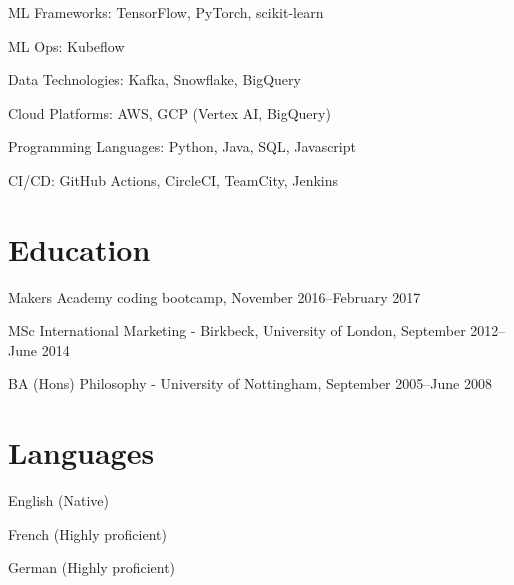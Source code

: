 \documentclass[a4paper]{scrartcl}
\begin{document}
ML Frameworks: TensorFlow, PyTorch, scikit-learn

ML Ops: Kubeflow

Data Technologies: Kafka, Snowflake, BigQuery

Cloud Platforms: AWS, GCP (Vertex AI, BigQuery)

Programming Languages: Python, Java, SQL, Javascript

CI/CD: GitHub Actions, CircleCI, TeamCity, Jenkins

\section*{Education}
Makers Academy coding bootcamp, November 2016--February 2017

MSc International Marketing - Birkbeck, University of London, September 2012--June 2014

BA (Hons) Philosophy - University of Nottingham, September 2005--June 2008

\section*{Languages}
English (Native)

French (Highly proficient)

German (Highly proficient)
\end{document}
